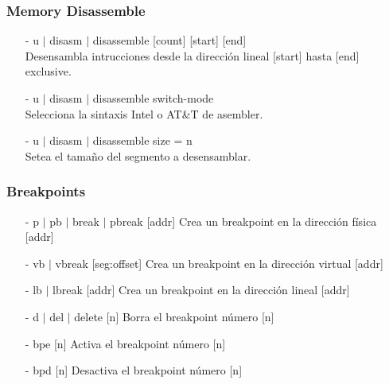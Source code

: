 \documentclass[aspectratio=169]{beamer}
\begin{document}
\begin{frame}
\frametitle{Memory Disassemble}
    \begin{itemize}
        \item[-]  u $|$ disasm $|$ disassemble [count] [start] [end]\\
        \textcolor{verdeuca}{Desensambla intrucciones desde la dirección lineal [start] hasta [end] exclusive.}%
        \vspace{0.2cm}
        \item[-]  u $|$ disasm $|$ disassemble switch-mode\\
        \textcolor{verdeuca}{Selecciona la sintaxis Intel o AT\&T de asembler.}%
        \vspace{0.2cm}
        \item[-]  u $|$ disasm $|$ disassemble size = n\\
        \textcolor{verdeuca}{Setea el tamaño del segmento a desensamblar.}%
    \end{itemize}
\end{frame}

\begin{frame}
\frametitle{Breakpoints}
    \begin{itemize}
    \item[-]  p $|$ pb $|$ break $|$ pbreak [addr] \hspace{0.5cm}
    \textcolor{verdeuca}{Crea un breakpoint en la dirección física [addr]} %
    \vspace{0.2cm}
    \item[-]  vb $|$ vbreak [seg:offset] \hspace{0.5cm}
    \textcolor{verdeuca}{Crea un breakpoint en la dirección virtual [addr]} %
    \vspace{0.2cm}
    \item[-]  lb $|$ lbreak [addr] \hspace{0.5cm}
    \textcolor{verdeuca}{Crea un breakpoint en la dirección lineal [addr]} %
    \vspace{0.2cm}
    \item[-]  d $|$ del $|$ delete [n] \hspace{0.5cm}
    \textcolor{verdeuca}{Borra el breakpoint número [n]} %
    \vspace{0.2cm}
    \item[-]  bpe [n] \hspace{0.5cm}
    \textcolor{verdeuca}{Activa el breakpoint número [n]} %
    \vspace{0.2cm}
    \item[-]  bpd [n] \hspace{0.5cm}
    \textcolor{verdeuca}{Desactiva el breakpoint número [n]} %
    \end{itemize}
\end{frame}
\end{document}
